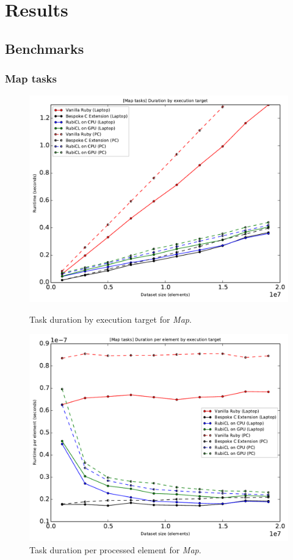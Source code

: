 \chapter{Results}

\section{Benchmarks}
\newpage
\subsection{Map tasks}
\begin{figure}[H]
  \centering
  \includegraphics[width=\textwidth]{./graphing/just_map/runtimes.pdf}
  \caption{Task duration by execution target for \emph{Map}.}
  \label{fig:map_task_runtime_g}

  \includegraphics[width=\textwidth]{./graphing/just_map/per_element.pdf}
  \caption{Task duration per processed element for \emph{Map}.}
  \label{fig:map_task_per_el_g}

\end{figure}
